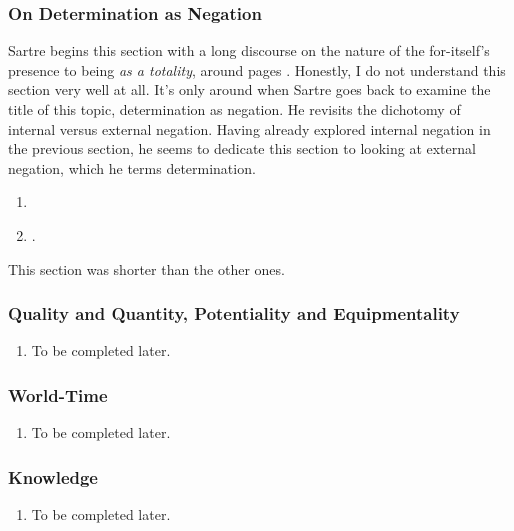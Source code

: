 \subsubsection{On Determination as Negation}

Sartre begins this section with a long discourse on the nature of the for-itself's presence to being \emph{as a totality}, around pages \autocite[256]{sartre}.
Honestly, I do not understand this section very well at all. It's only around \autocite[262]{sartre} when Sartre goes back to examine the title of this topic, determination as negation. He revisits the dichotomy of internal versus external negation. Having already explored internal negation in the previous section, he seems to dedicate this section to looking at external negation, which he terms determination.

\begin{enumerate}
  \item {}
  \item {}.
\end{enumerate}

\noindent
This section was shorter than the other ones.

\subsubsection{Quality and Quantity, Potentiality and Equipmentality}

\begin{enumerate}
  \item To be completed later.
\end{enumerate}

\subsubsection{World-Time}

\begin{enumerate}
  \item To be completed later.
\end{enumerate}

\subsubsection{Knowledge}

\begin{enumerate}
  \item To be completed later.
\end{enumerate}
